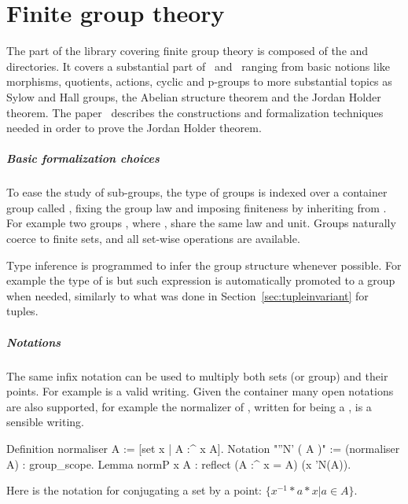 \chapter{Finite group theory}

The part of the library covering finite group theory is composed of
the  and  directories.  It covers a substantial
part of~\cite{gorenstein2007finite} and~\cite{9781139175319} ranging from
basic notions like morphisms, quotients, actions, cyclic and p-groups to more
substantial topics as Sylow and Hall groups, the Abelian
structure theorem and the Jordan Holder theorem.
The paper~\cite{DBLP:conf/mkm/Mahboubi13}
describes the constructions and formalization techniques
needed in order to prove the Jordan Holder theorem.

\paragraph{Basic formalization choices} To ease the study of sub-groups,
the type of groups is indexed over a container group called
, fixing the group law and imposing finiteness by
inheriting from .
For example two groups ,
where , share the same law and unit.  Groups
naturally coerce to finite sets, and all set-wise operations are available.

Type inference is programmed to infer the group structure whenever possible.
For example the type of  is  but such expression
is automatically promoted to a group when needed, similarly to what 
was done in Section~\ref{sec:tupleinvariant} for tuples.

\paragraph{Notations} The same infix \C{*} notation can be used to
multiply both sets (or group) and their points.  For example
 is a valid writing.  Given the 
container many open notations are also supported, for example the normalizer
of , written  for  being a , is a sensible
writing.

\begin{coq}{}{}
Definition normaliser A := [set x | A :^ x \subset A].
Notation "''N' ( A )" := (normaliser A) : group_scope.
Lemma normP x A : reflect (A :^ x = A) (x \in 'N(A)).
\end{coq}
Here \C{:^} is the notation for conjugating a set by a point:
$\{x^{-1}*a*x | a\in A\}$.


